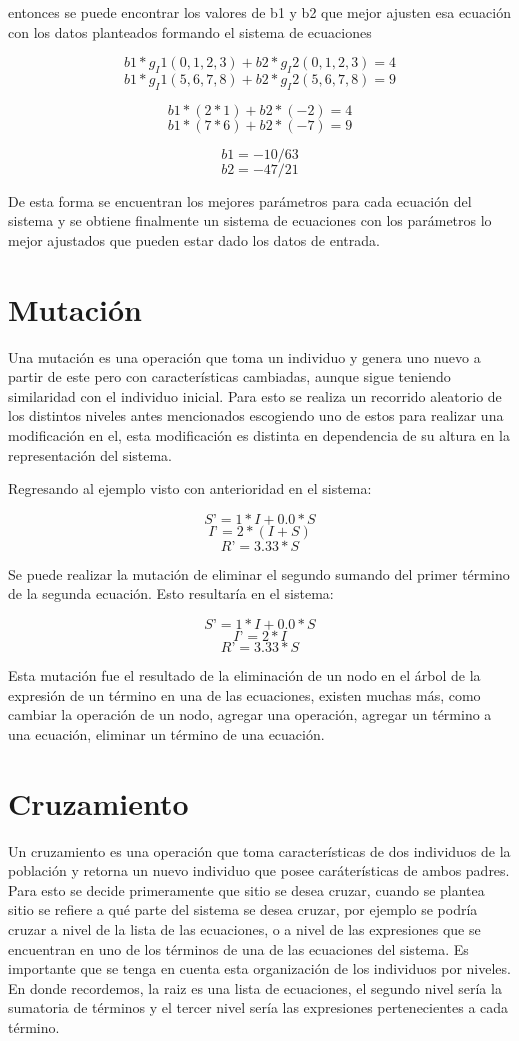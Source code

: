 entonces se puede encontrar los valores de b1 y b2 que mejor ajusten esa ecuación con los datos planteados formando el sistema de ecuaciones

$$b1 * g_I1(0, 1, 2, 3) + b2 * g_I2(0, 1, 2, 3) = 4$$
$$b1 * g_I1(5, 6, 7, 8) + b2 * g_I2(5, 6, 7, 8) = 9$$

$$b1 * (2 * 1) + b2 * (- 2) = 4$$
$$b1 * (7 * 6) + b2 * (- 7) = 9$$

$$b1 = -10/63$$
$$b2 = -47/21$$

De esta forma se encuentran los mejores parámetros para cada ecuación del sistema y se obtiene finalmente un sistema de ecuaciones con los parámetros lo mejor ajustados que pueden estar dado los datos de entrada.

\section{Mutación}

Una mutación es una operación que toma un individuo y genera uno nuevo a partir de este pero con características cambiadas, aunque sigue teniendo similaridad con el individuo inicial. Para esto se realiza un recorrido aleatorio de los distintos niveles antes mencionados escogiendo uno de estos para realizar una modificación en el, esta modificación es distinta en dependencia de su altura en la representación del sistema.

Regresando al ejemplo visto con anterioridad en el sistema:

$$S’ = 1 * I + 0.0 * S$$
$$I’ = 2 * (I + S)$$
$$R’ = 3.33 * S$$

Se puede realizar la mutación de eliminar el segundo sumando del primer término de la segunda ecuación. Esto resultaría en el sistema:

$$S’ = 1 * I + 0.0 * S$$
$$I’ = 2 * I$$
$$R’ = 3.33 * S$$

Esta mutación fue el resultado de la eliminación de un nodo en el árbol de la expresión de un término en una de las ecuaciones, existen muchas más, como cambiar la operación de un nodo, agregar una operación, agregar un término a una ecuación, eliminar un término de una ecuación.

\section{Cruzamiento}

Un cruzamiento es una operación que toma características de dos individuos de la población y retorna un nuevo individuo que posee caráterísticas de ambos padres. Para esto se decide primeramente que sitio se desea cruzar, cuando se plantea sitio se refiere a qué parte del sistema se desea cruzar, por ejemplo se podría cruzar a nivel de la lista de las ecuaciones, o a nivel de las expresiones que se encuentran en uno de los términos de una de las ecuaciones del sistema. Es importante que se tenga en cuenta esta organización de los individuos por niveles. En donde recordemos, la raiz es una lista de ecuaciones, el segundo nivel sería la sumatoria de términos y el tercer nivel sería las expresiones pertenecientes a cada término.

